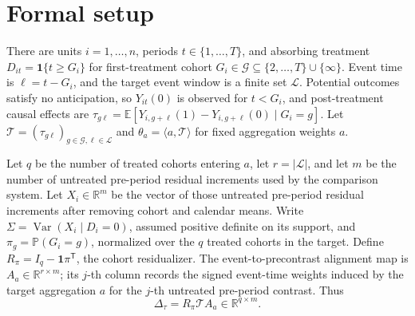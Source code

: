 \documentclass[11pt]{article}
\newcommand{\E}{\mathbb{E}}
\renewcommand{\Pr}{\mathbb{P}}
\newcommand{\one}{\mathbf{1}}
\newcommand{\transpose}{\mathsf{T}}
\newcommand{\R}{\mathbb{R}}
\theoremstyle{definition}
\theoremstyle{plain}
\theoremstyle{remark}
\begin{document}
\section{Formal setup}\label{sec:setup}
There are units \(i=1,\ldots,n\), periods \(t\in\{1,\ldots,T\}\), and absorbing
treatment \(D_{it}=\one\{t\ge G_i\}\) for first-treatment cohort
\(G_i\in\mathcal G\subseteq\{2,\ldots,T\}\cup\{\infty\}\).  Event time is
\(\ell=t-G_i\), and the target event window is a finite set \(\mathcal L\).
Potential outcomes satisfy no anticipation, so \(Y_{it}(0)\) is observed for
\(t<G_i\), and post-treatment causal effects are
\(\tau_{g\ell}=\E[Y_{i,g+\ell}(1)-Y_{i,g+\ell}(0)\mid G_i=g]\).  Let
\(\mathcal T=(\tau_{g\ell})_{g\in\mathcal G,\ell\in\mathcal L}\) and
\(\theta_a=\langle a,\mathcal T\rangle\) for fixed aggregation weights \(a\).

Let \(q\) be the number of treated cohorts entering \(a\), let \(r=|\mathcal L|\),
and let \(m\) be the number of untreated pre-period residual increments used by
the comparison system.  Let \(X_i\in\R^m\) be the vector of those untreated
pre-period residual increments after removing cohort and calendar means.  Write
\(\Sigma=\operatorname{Var}(X_i\mid D_i=0)\), assumed positive definite on its
support, and \(\pi_g=\Pr(G_i=g)\), normalized over the \(q\) treated cohorts in
the target.  Define \(R_\pi=I_q-\mathbf 1\pi^\transpose\), the cohort
residualizer.  The event-to-precontrast alignment map is
\(A_a\in\R^{r\times m}\); its \(j\)-th column records the signed event-time
weights induced by the target aggregation \(a\) for the \(j\)-th untreated
pre-period contrast.  Thus
\[
\Delta_\tau=R_\pi\mathcal T A_a\in\R^{q\times m}.
\]
\end{document}
